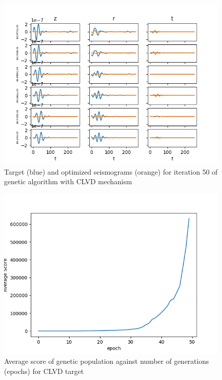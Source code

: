 \documentclass{article}
\begin{document}
\begin{figure}[H]
	\centering
	\includegraphics{dataSet3/plots/optimized49.png}
	\caption{Target (blue) and optimized seismograms (orange) for iteration 50 of genetic algorithm with CLVD mechanism}
	\label{convergenceCLVD3}
\end{figure}


\begin{figure}[H]
	\centering
	\includegraphics{dataSet2/scores.png}
	\caption{Average score of genetic population against number of generations (epochs) for CLVD target}
	\label{scoresCLVD}
\end{figure}
\end{document}
